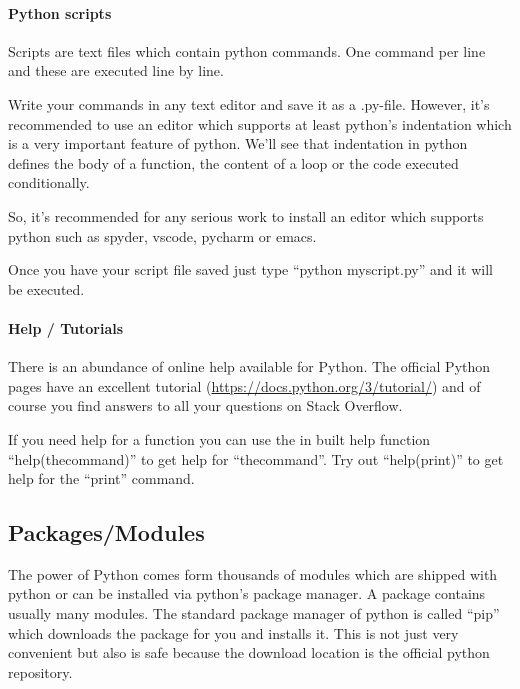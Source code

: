 \documentclass[12pt,a4paper]{article}
\begin{document}
\paragraph{Python scripts}
Scripts are text files which contain python commands. One command
per line and these are executed line by line.

Write your commands in any text editor and save it as a
.py-file. However, it's recommended to use an editor which supports at
least python's indentation which is a very important feature of python.
We'll see that indentation in python
defines the body of a function, the content of a loop or the code
executed conditionally.

So, it's recommended for any serious
work to install an editor which supports python such as spyder, vscode, pycharm
or emacs.

Once you have your script file saved just type ``python myscript.py''
and it will be executed.

\paragraph{Help / Tutorials}
There is an abundance of online help available for Python. The
official Python pages have an excellent tutorial
(\url{https://docs.python.org/3/tutorial/}) and of course you find
answers to all your questions on Stack Overflow.

If you need help for a function you can use the in built help function
``help(thecommand)'' to get help for ``thecommand''. Try out ``help(print)''
to get help for the ``print'' command.

\subsection{Packages/Modules}
The power of Python comes form thousands of modules which are shipped
with python or can be installed via python's package
manager. A package contains usually many modules.
The standard package manager of python is called ``pip''
which downloads the package for you and installs it. This is not just
very convenient but also is safe because the download location is the
official python repository.
\end{document}
